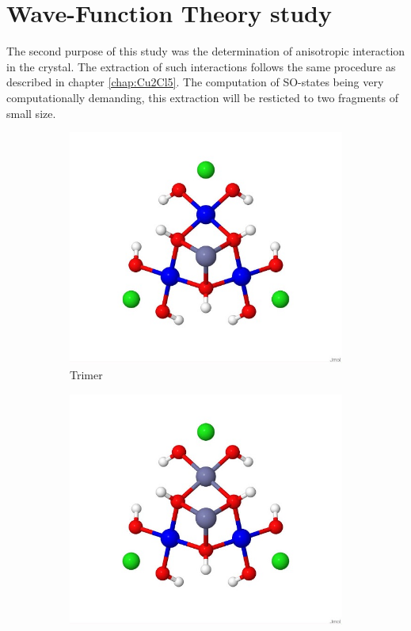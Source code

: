\documentclass[12pt]{report}
\numberwithin{equation}{section}
\begin{document}
\section{Wave-Function Theory study}

The second purpose of this study was the determination of anisotropic interaction in the crystal.
The extraction of such interactions follows the same procedure as described in chapter \autoref{chap:Cu2Cl5}.
The computation of SO-states being very computationally demanding, this extraction will be resticted to two fragments of small size.


\begin{figure}
    \centering
    \begin{subfigure}{.5\textwidth}
      \centering
      \includegraphics[width=\linewidth]{Images/Trimere.jpg}
      \caption{Trimer}
      \label{fig:subtrimer}
    \end{subfigure}%
    \begin{subfigure}{.5\textwidth}
      \centering
      \includegraphics[width=\linewidth]{Images/Dimer.jpg}

\end{subfigure}
\end{figure}
\end{document}
